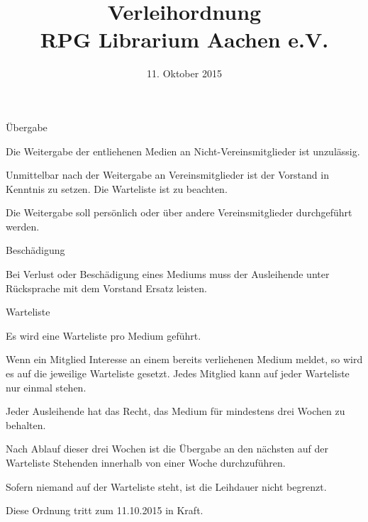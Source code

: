 \documentclass[11pt,a4paper,twoside,openany,article]{memoir}
\title{ Verleihordnung \\ RPG Librarium Aachen e.V.}
\date{11. Oktober 2015}
\begin{document}
  \maketitle
  \sloppy

\begin{para}{Übergabe}
  \item Die Weitergabe der entliehenen Medien an Nicht-Vereinsmitglieder ist unzulässig.
  \item Unmittelbar nach der Weitergabe an Vereinsmitglieder ist der Vorstand in Kenntnis zu setzen. Die Warteliste ist zu beachten.
  \item Die Weitergabe soll persönlich oder über andere Vereinsmitglieder durchgeführt werden.
\end{para}

\begin{para} {Beschädigung}
  \item Bei Verlust oder Beschädigung eines Mediums muss der Ausleihende unter Rücksprache mit dem Vorstand Ersatz leisten.
\end{para}

\begin{para}{Warteliste}
  \item Es wird eine Warteliste pro Medium geführt.
  \item Wenn ein Mitglied Interesse an einem bereits verliehenen Medium meldet, so wird es auf die jeweilige Warteliste gesetzt. Jedes Mitglied kann auf jeder Warteliste nur einmal stehen.
  \item Jeder Ausleihende hat das Recht, das Medium für mindestens drei Wochen zu behalten.
  \item Nach Ablauf dieser drei Wochen ist die Übergabe an den nächsten auf der Warteliste Stehenden innerhalb von einer Woche durchzuführen.
  \item Sofern niemand auf der Warteliste steht, ist die Leihdauer nicht begrenzt.
\end{para}

\begin{changes}
  \item Diese Ordnung tritt zum 11.10.2015 in Kraft.
\end{changes}
\end{document}
